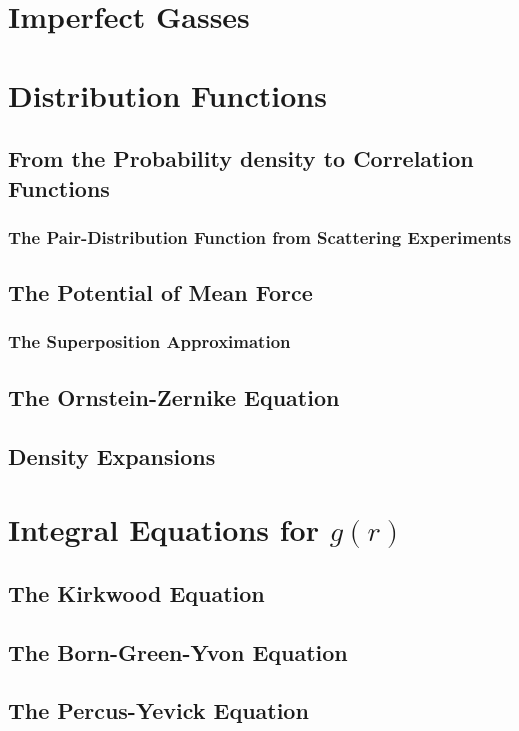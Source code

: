 \documentclass[a4paper,11pt]{article}
\begin{document}
\section{Imperfect Gasses}\label{sec:imperfect}

\section{Distribution Functions}\label{sec:distribution}
\subsection{From the Probability density to Correlation Functions}

\subsubsection{The Pair-Distribution Function from Scattering Experiments}
\subsection{The Potential of Mean Force}
\subsubsection{The Superposition Approximation}
\subsection{The Ornstein-Zernike Equation}
\subsection{Density Expansions}


\section{Integral Equations for $g(r)$}\label{sec:integral}

\subsection{The Kirkwood Equation}\label{ssec:kirkwood}

\subsection{The Born-Green-Yvon Equation}\label{ssec:born}
\subsection{The Percus-Yevick Equation}
\end{document}
